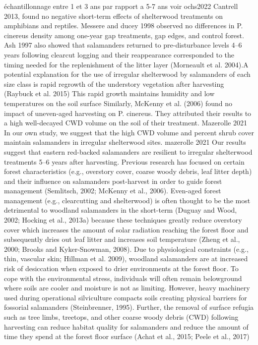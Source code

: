   échantillonnage entre 1 et 3 ans par rapport a 5-7 ans  voir ochs2022 
  Cantrell 2013, found no negative short-term effects of shelterwood treatments on amphibians and reptiles.
  Messere and ducey 1998 observed no differences in P. cinereus density among one-year gap treatments, gap edges, and control forest.
  Ash 1997 also showed that salamanders returned to pre-disturbance levels 4–6 years following clearcut logging and their reappearance corresponded to the timing needed for the replenishment of the litter layer
  (Morneault et al. 2004).A potential explanation for the use of irregular shelterwood by salamanders of each size class is rapid regrowth of the understory vegetation after harvesting 
  (Raybuck et al. 2015) This rapid growth maintains humidity and low temperatures on the soil surface 
  Similarly, McKenny et al. (2006) found no impact of uneven-aged harvesting on P. cinereus. They attributed their results to a high well-decayed CWD volume on the soil of their treatment. 
  Mazerolle 2021 In our own study, we suggest that the high CWD volume and percent shrub cover maintain salamanders in irregular shelterwood sites.
  mazerolle 2021 Our results suggest that eastern red-backed salamanders are resilient to irregular shelterwood treatments 5–6 years after harvesting.
  Previous research has focused on certain forest characteristics (e.g., overstory cover, coarse woody debris, leaf litter depth) and their influence on salamanders post-harvest in order to guide forest management (Semlitsch, 2002; McKenny et al., 2006).
  Even-aged forest management (e.g., clearcutting and shelterwood) is often thought to be the most detrimental to woodland salamanders in the short-term (Duguay and Wood, 2002; Hocking et al., 2013a) 
  because these techniques greatly reduce overstory cover which increases the amount of solar radiation reaching the forest floor and subsequently dries out leaf litter and increases soil temperature (Zheng et al., 2000; Brooks and Kyker-Snowman, 2008).
  Due to physiological constraints (e.g., thin, vascular skin; Hillman et al. 2009), woodland salamanders are at increased risk of desiccation when exposed to drier environments at the forest floor.
  To cope with the environmental stress, individuals will often remain belowground where soils are cooler and moisture is not as limiting. 
  However, heavy machinery used during operational silviculture compacts soils creating physical barriers for fossorial salamanders (Steinbrenner, 1995).
  Further, the removal of surface refugia such as tree limbs, treetops, and other coarse woody debris (CWD) following harvesting can reduce habitat quality for salamanders and reduce the amount of time they spend at the forest floor surface (Achat et al., 2015; Peele et al., 2017)
